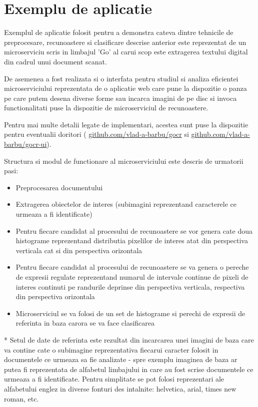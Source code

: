 \documentclass[10pt]{article}
\begin{document}
\newpage

\section{Exemplu de aplicatie}

\> Exemplul de aplicatie folosit pentru a demonstra cateva dintre tehnicile de preprocesare, recunoastere si clasificare
descrise anterior este reprezentat de un microserviciu scris in limbajul 'Go' al carui scop este extragerea textului digital din cadrul
unui document scanat.

\> De asemenea a fost realizata si o interfata pentru studiul si analiza eficientei microserviciului reprezentata de
o aplicatie web care pune la dispozitie o panza pe care putem desena diverse forme sau incarca imagini de pe disc si 
invoca functionalitati puse la dispozitie de microserviciul de recunoastere. 

\> Pentru mai multe detalii legate de implementari, acestea sunt puse la dispozitie pentru eventualii doritori (
\href{https://github.com/vlad-a-barbu/gocr}{github.com/vlad-a-barbu/gocr} si \href{https://github.com/vlad-a-barbu/gocr-ui}{github.com/vlad-a-barbu/gocr-ui}).

\> Structura si modul de functionare al microserviciului este descris de urmatorii pasi:

\begin{itemize}

  \item Preprocesarea documentului 
  \item Extragerea obiectelor de interes (subimagini reprezentand caracterele ce urmeaza a fi identificate) 
  \item Pentru fiecare candidat al procesului de recunoastere se vor genera cate doua histograme reprezentand
  distributia pixelilor de interes atat din perspectiva verticala cat si din perspectiva orizontala
  \item Pentru fiecare candidat al procesului de recunoastere se va genera o pereche de expresii regulate
  reprezentand numarul de intervale continue de pixeli de interes continuti pe randurile deprinse din perspectiva verticala,
  respectiva din perspectiva orizontala
  \item Microserviciul se va folosi de un set de histograme si perechi de expresii de referinta in baza carora se va face clasificarea
  
\end{itemize}

\> * Setul de date de referinta este rezultat din incarcarea unei imagini de baza care va contine cate o subimagine reprezentativa
fiecarui caracter folosit in documentele ce urmeaza sa fie analizate - spre exemplu imaginea de baza ar putea fi reprezentata de
alfabetul limbajului in care au fost scrise documentele ce urmeaza a fi identificate. Pentru simplitate se pot folosi reprezentari ale alfabetului englez
in diverse fonturi des intalnite: helvetica, arial, times new roman, etc.
\end{document}

